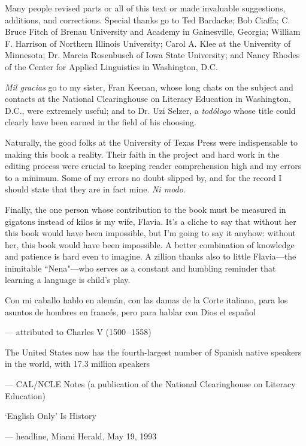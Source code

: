 Many people revised parts or all of this text or made invaluable suggestions, additions, and corrections. Special thanks go to
Ted Bardacke; Bob Ciaffa; C. Bruce Fitch of Brenau University and
Academy in Gainesville, Georgia; William F. Harrison of Northern
Illinois University; Carol A. Klee at the University of Minnesota;
Dr. Marcia Rosenbusch of Iowa State University; and Nancy Rhodes
of the Center for Applied Linguistics in Washington, D.C.

\emph{Mil gracias} go to my sister, Fran Keenan, whose long chats on
the subject and contacts at the National Clearinghouse on Literacy
Education in Washington, D.C., were extremely useful; and to Dr. Uzi
Selzer, a \emph{todólogo} whose title could clearly have been earned in the
field of his choosing.

Naturally, the good folks at the University of Texas Press were
indispensable to making this book a reality. Their faith in the project
and hard work in the editing process were crucial to keeping reader
comprehension high and my errors to a minimum. Some of my errors
no doubt slipped by, and for the record I should state that they are in
fact mine. \emph{Ni modo}.

Finally, the one person whose contribution to the book must
be measured in gigatons instead of kilos is my wife, Flavia. It's a cliche
to say that without her this book would have been impossible, but I'm
going to say it anyhow: without her, this book would have been impossible. A better combination of knowledge and patience is hard even to
imagine. A zillion thanks also to little Flavia---the inimitable ``Nena"---who serves as a constant and humbling reminder that learning a language is child's play.

\pagebreak
\thispagestyle{empty}
\vspace*{2in}

\epigraphfontsize{\normalsize\itshape}
\setlength\epigraphwidth{5in}
\setlength\epigraphrule{0pt}

\epigraph{Con mi caballo hablo en alemán,
con las damas de la Corte italiano,
para los asuntos de hombres en francés,
pero para hablar con Dios el español}
{--- \textup{attributed
to Charles V (1500\,--1558)}}

\epigraph{The United States now has the fourth-largest
number of Spanish native speakers in the world,
with 17.3 million speakers}
{--- \textup{CAL/NCLE Notes
(a publication of the National Clearinghouse
on Literacy Education)}}

\epigraph{`English Only'
Is History}
{--- \textup{headline},
Miami Herald,
\textup{May 19, 1993}}

